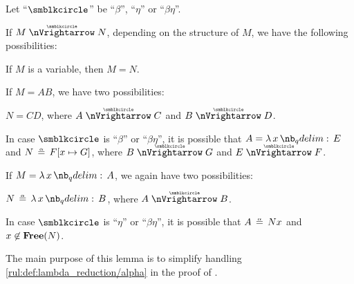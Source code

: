 \begin{lemma}\label{thm:parallel_reduction_deconstruction}
  Let \enquote{\( {\anon} \)} be \enquote{\( \beta \)}, \enquote{\( \eta \)} or \enquote{\( \beta\eta \)}.

  If \( M \ppred N \), depending on the structure of \( M \), we have the following possibilities:
  \begin{thmenum}
     If \( M \) is a variable, then \( M = N \).

     If \( M = AB \), we have two possibilities:
    \begin{thmenum}
       \( N = CD \), where \( A \ppred C \) and \( B \ppred D \).

       In case \( {\anon} \) is \enquote{\( \beta \)} or \enquote{\( \beta\eta \)}, it is possible that \( A = \qabs x E \) and \( N \aequiv F[x \mapsto G] \), where \( B \ppred G \) and \( E \ppred F \).
    \end{thmenum}

     If \( M = \qabs x A \), we again have two possibilities:
    \begin{thmenum}
       \( N \aequiv \qabs x B \), where \( A \ppred B \).

       In case \( {\anon} \) is \enquote{\( \eta \)} or \enquote{\( \beta\eta \)}, it is possible that \( A \aequiv Nx \) and \( x \not\in \op*{Free}(N) \).
    \end{thmenum}
  \end{thmenum}
\end{lemma}
\begin{comments}
  \item The main purpose of this lemma is to simplify handling \ref{rul:def:lambda_reduction/alpha} in the proof of .
\end{comments}
